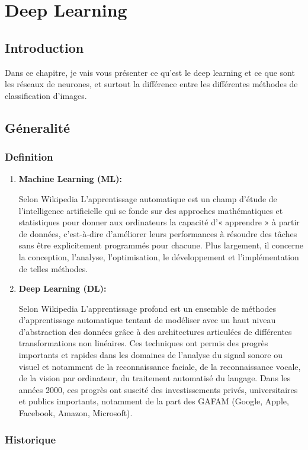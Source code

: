 \chapter{Deep Learning}

\section*{Introduction}
    Dans ce chapitre, je vais vous présenter ce qu'est le deep learning et ce que sont les réseaux de neurones, et surtout la différence entre les différentes méthodes de classification d'images.
\section{Géneralité}
    \subsection{Definition}
        \begin{enumerate}
            \item \textbf{Machine Learning (ML):} 
            
            Selon Wikipedia L'apprentissage automatique est un champ d'étude de l'intelligence artificielle qui se fonde sur des approches mathématiques et statistiques pour donner aux ordinateurs la capacité d'« apprendre » à partir de données, c'est-à-dire d'améliorer leurs performances à résoudre des tâches sans être explicitement programmés pour chacune. Plus largement, il concerne la conception, l'analyse, l'optimisation, le développement et l'implémentation de telles méthodes.
            \item \textbf{Deep Learning (DL):} 
            
            Selon Wikipedia L'apprentissage profond est un ensemble de méthodes d'apprentissage automatique tentant de modéliser avec un haut niveau d’abstraction des données grâce à des architectures articulées de différentes transformations non linéaires. Ces techniques ont permis des progrès importants et rapides dans les domaines de l'analyse du signal sonore ou visuel et notamment de la reconnaissance faciale, de la reconnaissance vocale, de la vision par ordinateur, du traitement automatisé du langage. Dans les années 2000, ces progrès ont suscité des investissements privés, universitaires et publics importants, notamment de la part des GAFAM (Google, Apple, Facebook, Amazon, Microsoft).
        \end{enumerate}
    \subsection{Historique}
    
